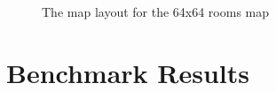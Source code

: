 \documentclass[runningheads]{llncs}
\begin{document}
\begin{figure}[H]
\caption{The map layout for the 64x64 rooms map}
\end{figure}

\newpage

\section{Benchmark Results}
\end{document}
